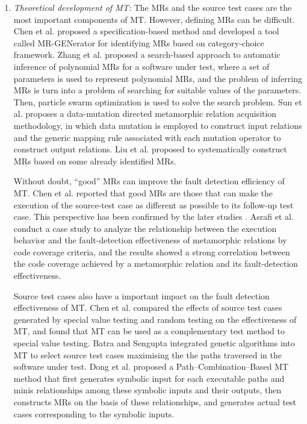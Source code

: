 \documentclass[conference]{IEEEtran}
\begin{document}
\begin{enumerate}[1]
  \item
  \emph{Theoretical development of MT:} The MRs and the source test cases are the most important components of MT. However, defining MRs can be difficult. Chen et al. \cite{chen2016metric} proposed a specification-based method and developed a tool called MR-GENerator for identifying MRs based on category-choice framework\cite{ostrand1988category}.
  Zhang et al. \cite{zhang2014search} proposed a search-based approach to automatic inference of polynomial MRs for a software under test, where a set of parameters is used to represent polynomial MRs, and the problem of inferring MRs is turn into a problem of searching for suitable values of the parameters. Then, particle swarm optimization is used to solve the search problem.
  Sun et al. \cite{sun2016mumt} proposes a data-mutation directed metamorphic relation acquisition methodology, in which data mutation is employed to construct input relations and the generic mapping rule associated with each mutation operator to construct output relations.
  Liu et al. \cite{liu2012new} proposed to systematically construct MRs based on some already identified MRs.

  Without doubt, ``good'' MRs can improve the fault detection efficiency of MT.
  Chen et al. \cite{chen2004case} reported that good MRs are those that can make the execution of the source-test case as different as possible to its follow-up test case.
  This perspective has been confirmed by the later studies \cite{dong2013security, batra2011efficient}.
  Asrafi et al. \cite{asrafi2011testing} conduct a case study to analyze the relationship between the execution behavior and the fault-detection effectiveness of metamorphic relations by code coverage criteria, and the results showed a strong correlation between the code coverage achieved by a metamorphic relation and its fault-detection effectiveness.

  Source test cases also have a important impact on the fault detection effectiveness of MT.
  Chen et al. \cite{chen2004metamorphic} compared the effects of source test cases generated by special value testing and random testing on the effectiveness of MT, and found that MT can be used as a complementary test method to special value testing.
  Batra and  Sengupta \cite{batra2011efficient} integrated genetic algorithms into MT to select source test cases maximising the the paths traversed in the software under test.
  Dong et al. \cite{dong2013security} proposed a Path--Combination--Based MT method that first generates symbolic input for each executable paths and minis relationships among these symbolic inputs and their outputs, then constructs MRs on the basis of these relationships, and generates actual test cases corresponding to the symbolic inputs.


\end{enumerate}
\end{document}
